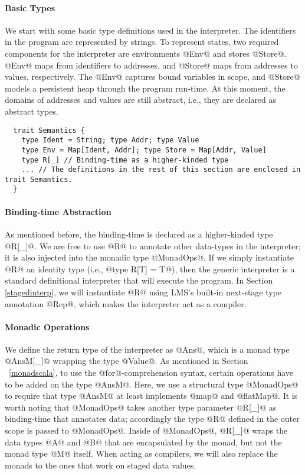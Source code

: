 \paragraph{Basic Types} We start with some basic type definitions used in the
interpreter. The identifiers in the program are represented by
strings. To represent states, two required components for the
interpreter are environments @Env@ and stores @Store@. @Env@ maps from
identifiers to addresses, and @Store@ maps from addresses to values,
respectively. The @Env@ captures bound variables in scope, and @Store@
models a persistent heap through the program run-time.  At this moment,
the domains of addresses and values are still abstract, i.e., they are
declared as abstract types.
\begin{lstlisting}
  trait Semantics {
    type Ident = String; type Addr; type Value
    type Env = Map[Ident, Addr]; type Store = Map[Addr, Value]
    type R[_] // Binding-time as a higher-kinded type
    ... // The definitions in the rest of this section are enclosed in trait Semantics.
  }
\end{lstlisting}

\paragraph{Binding-time Abstraction} As mentioned before, the binding-time is
declared as a higher-kinded type @R[_]@. We are free to use @R@ to annotate
other data-types in the interpreter; it is also injected into the monadic
type @MonadOps@.
If we simply instantiate @R@ an identity type (i.e., @type R[T] = T@),
then the generic interpreter is a standard definitional interpreter
that will execute the program.  In Section \ref{stagedinterp}, we will
instantiate @R@ using LMS's built-in next-stage type annotation @Rep@,
which makes the interpreter act as a compiler.

\paragraph{Monadic Operations} We define the return type of the interpreter as
@Ans@, which is a monad type @AnsM[_]@ wrapping the type @Value@. 
As mentioned in Section ~\ref{monadscala}, to use the @for@-comprehension
syntax, certain operations have to be added on the type @AnsM@. Here, we use a
structural type @MonadOps@ to require that type @AnsM@ at least implements @map@ and
@flatMap@. It is worth noting that @MonadOps@ takes another type parameter
@R[_]@ as binding-time that annotates data; accordingly the type @R@
defined in the outer scope is passed to @MonadOps@. Inside of @MonadOps@,
@R[_]@ wraps the data types @A@ and @B@ that are encapsulated by the
monad, but not the monad type @M@ itself. When acting as compilers, we
will also replace the monads to the ones that work on staged data values.

